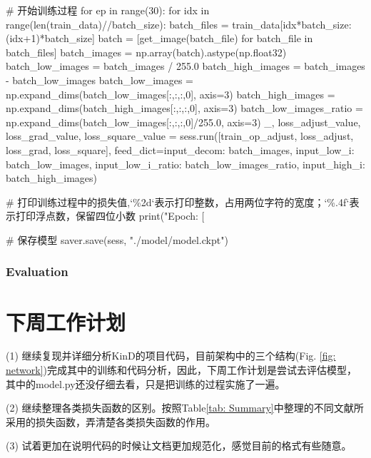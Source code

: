 \documentclass[letterpaper,12pt]{article}
\begin{document}
			\begin{python}
			# 开始训练过程
			for ep in range(30):
				for idx in range(len(train_data)//batch_size):
					batch_files = train_data[idx*batch_size:(idx+1)*batch_size]
					batch = [get_image(batch_file) for batch_file in batch_files]
					batch_images = np.array(batch).astype(np.float32)
					batch_low_images = batch_images / 255.0
					batch_high_images = batch_images - batch_low_images
					batch_low_images = np.expand_dims(batch_low_images[:,:,:,0], axis=3)
					batch_high_images = np.expand_dims(batch_high_images[:,:,:,0], axis=3)
					batch_low_images_ratio = np.expand_dims(batch_low_images[:,:,:,0]/255.0, axis=3)
					_, loss_adjust_value, loss_grad_value, loss_square_value = sess.run([train_op_adjust, loss_adjust, loss_grad, loss_square], feed_dict={input_decom: batch_images, input_low_i: batch_low_images, input_low_i_ratio: batch_low_images_ratio, input_high_i: batch_high_images})
					
			# 打印训练过程中的损失值,`\%2d`表示打印整数，占用两位字符的宽度；`\%.4f`表示打印浮点数，保留四位小数		
			print("Epoch: [%
			
			# 保存模型
			saver.save(sess, "./model/model.ckpt")
			\end{python}
			
		\subsubsection{Evaluation}
		
			
			
	
	
	\section{下周工作计划}
	
	(1) 继续复现并详细分析KinD的项目代码，目前架构中的三个结构(Fig. \ref{fig: network})完成其中的训练和代码分析，因此，下周工作计划是尝试去评估模型，其中的model.py还没仔细去看，只是把训练的过程实施了一遍。
	
	(2) 继续整理各类损失函数的区别。按照Table\ref{tab: Summary}中整理的不同文献所采用的损失函数，弄清楚各类损失函数的作用。
	
	(3) 试着更加在说明代码的时候让文档更加规范化，感觉目前的格式有些随意。
	
\end{document}
